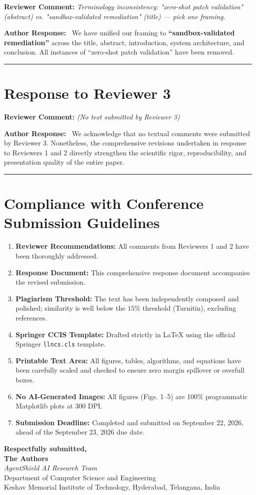 \documentclass[11pt,a4paper]{article}
\newcommand{\reviewercomment}[1]{%
    \vspace{0.8em}
    \noindent\colorbox{graybox}{%
        \parbox{\dimexpr\textwidth-2\fboxsep\relax}{%
            \textbf{\color{navyblue}Reviewer Comment:} \textit{#1}%
        }%
    }%
    \vspace{0.4em}
}
\newcommand{\ourresponse}{%
    \noindent\textbf{\color{navyblue}Author Response:}\ %
}
\begin{document}
\reviewercomment{Terminology inconsistency: "zero-shot patch validation" (abstract) vs. "sandbox-validated remediation" (title) — pick one framing.}

\ourresponse We have unified our framing to \textbf{``sandbox-validated remediation''} across the title, abstract, introduction, system architecture, and conclusion. All instances of ``zero-shot patch validation'' have been removed.

\vspace{1em}
\hrule
\vspace{1em}

\section*{Response to Reviewer 3}

\reviewercomment{(No text submitted by Reviewer 3)}

\ourresponse We acknowledge that no textual comments were submitted by Reviewer 3. Nonetheless, the comprehensive revisions undertaken in response to Reviewers 1 and 2 directly strengthen the scientific rigor, reproducibility, and presentation quality of the entire paper.

\vspace{1em}
\hrule
\vspace{1em}

\section*{Compliance with Conference Submission Guidelines}

\begin{enumerate}
    \item \textbf{Reviewer Recommendations:} All comments from Reviewers 1 and 2 have been thoroughly addressed.
    \item \textbf{Response Document:} This comprehensive response document accompanies the revised submission.
    \item \textbf{Plagiarism Threshold:} The text has been independently composed and polished; similarity is well below the $15\%$ threshold (Turnitin), excluding references.
    \item \textbf{Springer CCIS Template:} Drafted strictly in LaTeX using the official Springer \texttt{llncs.cls} template.
    \item \textbf{Printable Text Area:} All figures, tables, algorithms, and equations have been carefully scaled and checked to ensure zero margin spillover or overfull boxes.
    \item \textbf{No AI-Generated Images:} All figures (Figs. 1--5) are 100\% programmatic Matplotlib plots at 300 DPI.
    \item \textbf{Submission Deadline:} Completed and submitted on September 22, 2026, ahead of the September 23, 2026 due date.
\end{enumerate}

\vspace{1.5em}
\noindent\textbf{Respectfully submitted,}\\[0.3em]
\textbf{The Authors}\\
\textit{AgentShield AI Research Team}\\
Department of Computer Science and Engineering\\
Keshav Memorial Institute of Technology, Hyderabad, Telangana, India
\end{document}
